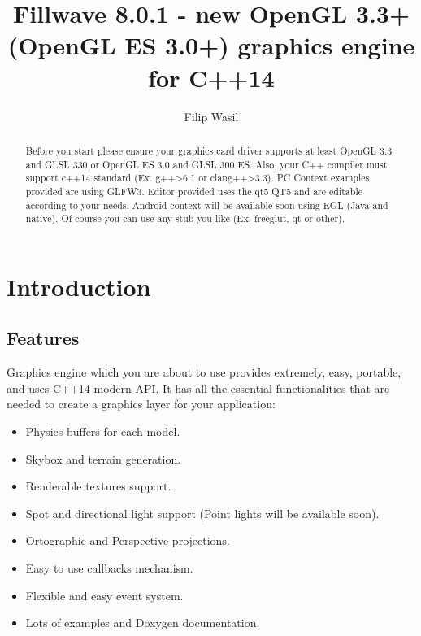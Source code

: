 \documentclass{article}
\begin{document}
\title{\textbf{Fillwave 8.0.1}
 - new OpenGL 3.3+ (OpenGL ES 3.0+) graphics engine for C++14 }
\author{Filip Wasil}

\maketitle

\begin{abstract}
Before you start please ensure your graphics card driver supports at least OpenGL 3.3 and GLSL 330 or OpenGL ES 3.0 and GLSL 300 ES. Also, your C++ compiler must support c++14 standard (Ex. g++\textgreater6.1 or clang++\textgreater3.3). PC Context examples provided are using GLFW3. Editor provided uses the qt5 QT5 and are editable according to your needs. Android context will be available soon using EGL (Java and native). Of course you can use any stub you like (Ex. freeglut, qt or other).
\end{abstract}

\pagebreak
\tableofcontents

\newpage

\section{Introduction}
\subsection{Features}\label{sec:Features}
\indent \indent Graphics engine which you are about to use provides extremely, easy, portable, and uses C++14 modern API. It has all the essential functionalities that are needed to create a graphics layer for your application:

\begin{itemize}
  \item Physics buffers for each model.
  \item Skybox and terrain generation.
  \item Renderable textures support.
  \item Spot and directional light support (Point lights will be available soon).
  \item Ortographic and Perspective projections.
  \item Easy to use callbacks mechanism.
  \item Flexible and easy event system.
  \item Lots of examples and Doxygen documentation.
\end{itemize}
\end{document}
